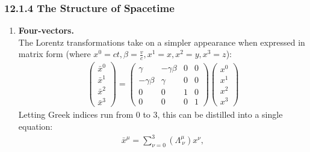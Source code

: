 \documentclass[12pt]{book}
\begin{document}
\subsubsection{12.1.4 The Structure of Spacetime}
    \begin{enumerate}
        \item \textbf{Four-vectors.} \\
            The Lorentz transformations take on a simpler appearance when expressed in matrix form (where $x^0=ct, \beta = \frac{v}{c}, x^1=x, x^2=y, x^3=z$): 
            \begin{align}
            \begin{pmatrix}
            \bar{x}^0 \\
            \bar{x}^1 \\
            \bar{x}^2 \\
            \bar{x}^3
            \end{pmatrix}
            =
            \begin{pmatrix}
            \gamma & -\gamma\beta & 0 & 0 \\
            -\gamma\beta & \gamma & 0 & 0 \\
            0 & 0 & 1 & 0 \\
            0 & 0 & 0 & 1
            \end{pmatrix}
            \begin{pmatrix}
            x^0 \\
            x^1 \\
            x^2 \\
            x^3
            \end{pmatrix}
            \end{align}   
            Letting Greek indices run from 0 to 3, this can be distilled into a single equation:
            \begin{align}
            \bar{x}^\mu = \sum_{\nu=0}^{3} (\Lambda^\mu_{\ \nu}) x^\nu,
            \end{align}
        

\end{enumerate}
\end{document}
